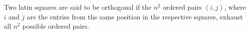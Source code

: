 Two latin squares are said to be orthogonal if the $n^2$ ordered pairs $(i,j)$, where $i$ and $j$ are the entries from the same position in the respective squares, exhaust all $n^2$ possible ordered pairs.
